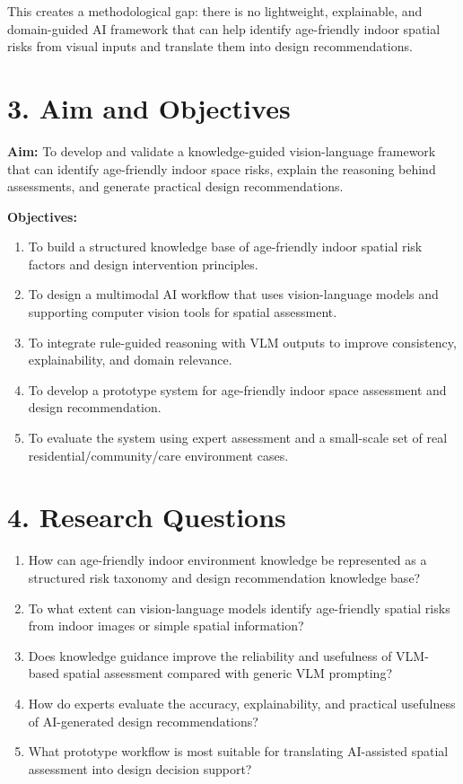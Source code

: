 \documentclass[11pt,a4paper]{article}
\begin{document}
This creates a methodological gap: there is no lightweight, explainable, and domain-guided AI framework that can help identify age-friendly indoor spatial risks from visual inputs and translate them into design recommendations.

\section*{3. Aim and Objectives}
\textbf{Aim:} To develop and validate a knowledge-guided vision-language framework that can identify age-friendly indoor space risks, explain the reasoning behind assessments, and generate practical design recommendations.

\textbf{Objectives:}
\begin{enumerate}
  \item To build a structured knowledge base of age-friendly indoor spatial risk factors and design intervention principles.
  \item To design a multimodal AI workflow that uses vision-language models and supporting computer vision tools for spatial assessment.
  \item To integrate rule-guided reasoning with VLM outputs to improve consistency, explainability, and domain relevance.
  \item To develop a prototype system for age-friendly indoor space assessment and design recommendation.
  \item To evaluate the system using expert assessment and a small-scale set of real residential/community/care environment cases.
\end{enumerate}

\section*{4. Research Questions}
\begin{enumerate}
  \item How can age-friendly indoor environment knowledge be represented as a structured risk taxonomy and design recommendation knowledge base?
  \item To what extent can vision-language models identify age-friendly spatial risks from indoor images or simple spatial information?
  \item Does knowledge guidance improve the reliability and usefulness of VLM-based spatial assessment compared with generic VLM prompting?
  \item How do experts evaluate the accuracy, explainability, and practical usefulness of AI-generated design recommendations?
  \item What prototype workflow is most suitable for translating AI-assisted spatial assessment into design decision support?
\end{enumerate}
\end{document}
